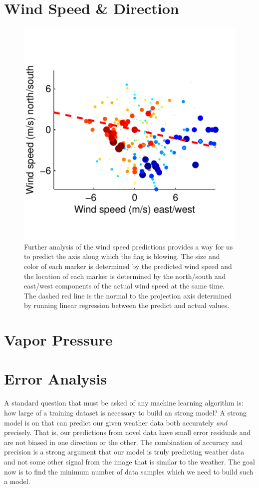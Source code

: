 \section{Wind Speed \& Direction}
\begin{figure}
	\centering
		\includegraphics{figures/windspeedscatter.pdf}
	\caption{Further analysis of the wind speed predictions provides a way for us to predict the axis along which the flag is blowing. The size and color of each marker is determined by the predicted wind speed and the location of each marker is determined by the north/south and east/west components of the actual wind speed at the same time. The dashed red line is the normal to the projection axis determined by running linear regression between the predict and actual values.}
	\label{fig:windspeedscatter}
\end{figure}

\section{Vapor Pressure}

\section{Error Analysis}
A standard question that must be asked of any machine learning algorithm is: how large of a training dataset is necessary to build an strong model? A strong model is on that can predict our given weather data both accurately \textit{and} precisely. That is, our predictions from novel data have small error residuals and are not biased in one direction or the other. The combination of accuracy and precision is a strong argument that our model is truly predicting weather data and not some other signal from the image that is similar to the weather. The goal now is to find the minimum number of data samples which we need to build such a model. 

